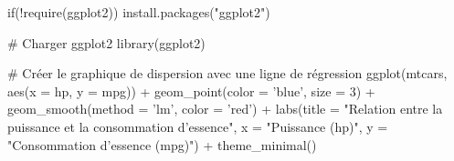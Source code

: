 if(!require(ggplot2)) {
  install.packages("ggplot2")
}

# Charger ggplot2
library(ggplot2)

# Créer le graphique de dispersion avec une ligne de régression
ggplot(mtcars, aes(x = hp, y = mpg)) +
  geom_point(color = 'blue', size = 3) +    
  geom_smooth(method = 'lm', color = 'red') + 
  labs(title = "Relation entre la puissance et la consommation d'essence",
       x = "Puissance (hp)",
       y = "Consommation d'essence (mpg)") +
  theme_minimal()                                              
